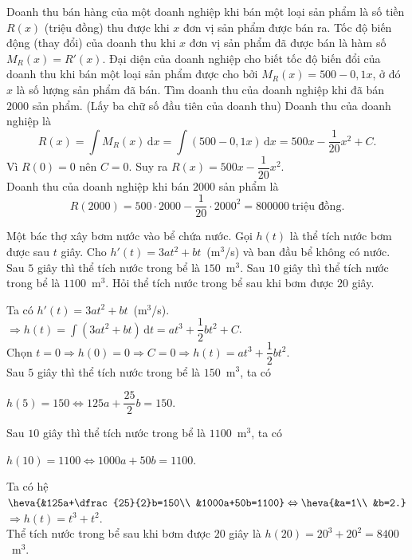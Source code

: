 \begin{bt}%
Doanh thu bán hàng của một doanh nghiệp khi bán một loại sản phẩm là số tiền $R(x)$ (triệu đồng) thu được khi $x$ đơn vị sản phẩm được bán ra. Tốc độ biến động (thay đổi) của doanh thu khi $x$	đơn vị sản phẩm đã được bán là hàm số $M_R(x)=R'(x)$. Đại diện của doanh nghiệp cho biết tốc độ biến đổi của doanh thu khi bán một loại sản phẩm được cho bởi $M_R(x)=500-0{,}1x$, ở đó $x$ là số lượng sản phẩm đã bán. Tìm doanh thu của doanh nghiệp khi đã bán $2000$ sản phẩm. (Lấy ba chữ số đầu tiên của doanh thu)
\loigiai
{
	Doanh thu của doanh nghiệp là $$R(x)=\displaystyle\int M_R(x)\mathrm{\,d}x =\displaystyle\int (500-0{,}1x)\mathrm{\,d}x =500x-\dfrac{1}{20}x^2+C.$$
	Vì $R(0)=0$ nên $C=0$. Suy ra $R(x)=500x-\dfrac{1}{20}x^2$.\\
	Doanh thu của doanh nghiệp khi bán $2000$ sản phẩm là $$R(2000)=500\cdot2000-\dfrac{1}{20}\cdot2000^2=800000~\text{triệu đồng.}$$
}
\end{bt}

\begin{bt}%
Một bác thợ xây bơm nước vào bể chứa nước. Gọi $h(t)$ là thể tích nước bơm được sau $t$ giây. Cho $h'(t)=3at^2+bt$~(m$^3$/s) và ban đầu bể không có nước. Sau $5$ giây thì thể tích nước trong bể là $150$~m$^3$. Sau	$10$ giây thì thể tích nước trong bể là $1100$~m$^3$. Hỏi thể tích nước trong bể sau khi bơm được $20$ giây.
\loigiai
{
	Ta có $h'(t)=3at^2+bt$~(m$^3$/s).\\
	$\Rightarrow h(t)=\displaystyle\int (3at^2+bt)\mathrm{\,d}t=at^3+\dfrac{1}{2}bt^2+C$.\\
	Chọn $t=0\Rightarrow h(0)=0\Rightarrow C=0\Rightarrow h(t)=at^3+\dfrac{1}{2}bt^2$.\\
	Sau $5$ giây thì thể tích nước trong bể là $150$~m$^3$, ta có\\ \centerline{$h(5)=150\Leftrightarrow 125a+\dfrac{25}{2}b=150.$}
	Sau $10$ giây thì thể tích nước trong bể là $1100$~m$^3$, ta có\\
	\centerline{$h(10)=1100\Leftrightarrow 1000a+50b=1100.$}
	Ta có hệ $\heva{&125a+\dfrac{25}{2}b=150\\ &1000a+50b=1100}\Leftrightarrow \heva{&a=1\\ &b=2.}$\\
	$\Rightarrow h(t)=t^3+t^2$.\\
	Thể tích nước trong bể sau khi bơm được $20$ giây là $h(20)=20^3+20^2=8400$~m$^3$.
}
\end{bt}

